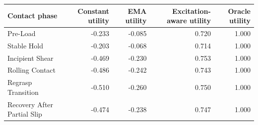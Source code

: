 \begin{tabular}{lrrrr}
\toprule
Contact phase & Constant utility & EMA utility & Excitation-aware utility & Oracle utility \\
\midrule
Pre-Load & -0.233 & -0.085 & 0.720 & 1.000 \\
Stable Hold & -0.203 & -0.068 & 0.714 & 1.000 \\
Incipient Shear & -0.469 & -0.230 & 0.753 & 1.000 \\
Rolling Contact & -0.486 & -0.242 & 0.743 & 1.000 \\
Regrasp Transition & -0.510 & -0.260 & 0.750 & 1.000 \\
Recovery After Partial Slip & -0.474 & -0.238 & 0.747 & 1.000 \\
\bottomrule
\end{tabular}
